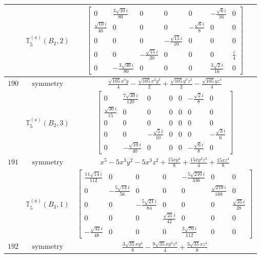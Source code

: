 \documentclass[fleqn,8pt,landscape]{jsarticle}
\begin{document}
\begin{longtable}{ccc}
$  $ & $ \mathbb{T}_{5}^{(a)}(B_{2},2) $ & $ \begin{bmatrix} 0 & \frac{3 \sqrt{10} i}{80} & 0 & 0 & 0 & - \frac{\sqrt{6} i}{16} & 0 \\ \frac{\sqrt{10} i}{40} & 0 & 0 & 0 & - \frac{\sqrt{6} i}{8} & 0 & 0 \\ 0 & 0 & 0 & - \frac{\sqrt{15} i}{10} & 0 & 0 & 0 \\ 0 & 0 & - \frac{\sqrt{15} i}{20} & 0 & 0 & 0 & \frac{i}{4} \\ 0 & - \frac{3 \sqrt{30} i}{80} & 0 & 0 & 0 & \frac{3 \sqrt{2} i}{16} & 0 \end{bmatrix} $ \\ \hline
$ 190 $ & $ \text{symmetry} $ & $ \frac{\sqrt{105} x^{4} y}{4} - \frac{\sqrt{105} x^{2} y^{3}}{2} + \frac{\sqrt{105} y^{3} z^{2}}{2} - \frac{\sqrt{105} y z^{4}}{4} $ \\
$  $ & $ \mathbb{T}_{5}^{(a)}(B_{2},3) $ & $ \begin{bmatrix} 0 & \frac{7 \sqrt{30} i}{120} & 0 & 0 & 0 & - \frac{\sqrt{2} i}{8} & 0 \\ \frac{\sqrt{30} i}{15} & 0 & 0 & 0 & 0 & 0 & 0 \\ 0 & 0 & 0 & 0 & 0 & 0 & 0 \\ 0 & 0 & - \frac{\sqrt{5} i}{10} & 0 & 0 & 0 & - \frac{\sqrt{3} i}{6} \\ 0 & - \frac{\sqrt{10} i}{40} & 0 & 0 & 0 & - \frac{\sqrt{6} i}{8} & 0 \end{bmatrix} $ \\ \hline
$ 191 $ & $ \text{symmetry} $ & $ x^{5} - 5 x^{3} y^{2} - 5 x^{3} z^{2} + \frac{15 x y^{4}}{8} + \frac{15 x y^{2} z^{2}}{4} + \frac{15 x z^{4}}{8} $ \\
$  $ & $ \mathbb{T}_{5}^{(a)}(B_{3},1) $ & $ \begin{bmatrix} \frac{11 \sqrt{14} i}{112} & 0 & 0 & 0 & - \frac{5 \sqrt{210} i}{336} & 0 & 0 \\ 0 & - \frac{5 \sqrt{14} i}{56} & 0 & 0 & 0 & \frac{\sqrt{210} i}{168} & 0 \\ 0 & 0 & - \frac{5 \sqrt{21} i}{84} & 0 & 0 & 0 & \frac{\sqrt{35} i}{28} \\ 0 & 0 & 0 & \frac{\sqrt{21} i}{42} & 0 & 0 & 0 \\ - \frac{\sqrt{42} i}{48} & 0 & 0 & 0 & \frac{3 \sqrt{70} i}{112} & 0 & 0 \end{bmatrix} $ \\ \hline
$ 192 $ & $ \text{symmetry} $ & $ \frac{3 \sqrt{35} x y^{4}}{8} - \frac{9 \sqrt{35} x y^{2} z^{2}}{4} + \frac{3 \sqrt{35} x z^{4}}{8} $ \\

\end{longtable}
\end{document}

